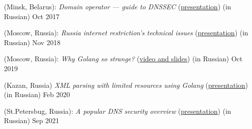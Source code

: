 %
 (Minsk, Belarus): \textit{Domain operator --- guide to DNSSEC} (\href{https://www.slideshare.net/schors/enog14-dnssec}{presentation}) (in Russian) \hfill Oct 2017

%
 (Moscow, Russia): \textit{Russia internet restriction's technical issues} (\href{https://www.slideshare.net/schors/ss-123038251}{presentation}) (in Russian) \hfill Nov 2018

 (Moscow, Russia): \textit{Why Golang so strange?} (\href{https://golangconf.ru/2019/abstracts/5753}{video and slides}) (in Russian) \hfill Oct 2019

 (Kazan, Russia) \textit{XML parsing with limited resources using Golang}  (\href{https://www.slideshare.net/schors/xml-vds}{presentation}) (in Russian) \hfill Feb 2020

 (St.Petersbug, Russia): \textit{A popular DNS security overview} (\href{https://www.slideshare.net/schors/a-popular-dns-security-overview}{presentation}) (in Russian) \hfill Sep 2021
